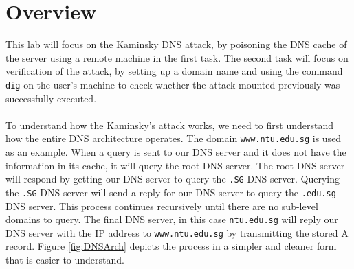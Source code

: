 \documentclass[a4paper,12pt]{article}
\begin{document}
\section{Overview}
This lab will focus on the Kaminsky DNS attack, by poisoning the DNS cache of the server using a remote machine in the first task. The second task will focus on verification of the attack, by setting up a domain name and using the command \texttt{dig} on the user's machine to check whether the attack mounted previously was successfully executed.\\\\To understand how the Kaminsky's attack works, we need to first understand how the entire DNS architecture operates. The domain \texttt{www.ntu.edu.sg} is used as an example. When a query is sent to our DNS server and it does not have the information in its cache, it will query the root DNS server. The root DNS server will respond by getting our DNS server to query the \texttt{.SG} DNS server. Querying the \texttt{.SG} DNS server will send a reply for our DNS server to query the \texttt{.edu.sg} DNS server. This process continues recursively until there are no sub-level domains to query. The final DNS server, in this case \texttt{ntu.edu.sg} will reply our DNS server with the IP address to \texttt{www.ntu.edu.sg} by transmitting the stored A record. Figure \ref{fig:DNSArch} depicts the process in a simpler and cleaner form that is easier to understand.

\end{document}
